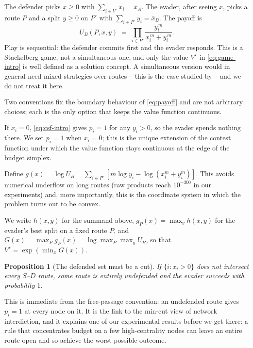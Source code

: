 \documentclass[11pt,a4paper]{article}
\theoremstyle{plain}
\newtheorem{proposition}[theorem]{Proposition}
\theoremstyle{definition}
\newcommand{\XA}{\bar{x}_A}
\newcommand{\XB}{\bar{x}_B}
\begin{document}
The defender picks $x\ge0$ with $\sum_{i\in V^{\circ}}x_i=\XA$. The evader,
after seeing $x$, picks a route $P$ and a split $y\ge0$ on $P^{\circ}$ with
$\sum_{i\in P^{\circ}}y_i=\XB$. The payoff is
\begin{equation}
  U_B(P,x,y)\;=\;\prod_{i\in P^{\circ}} \frac{y_i^{\,m}}{x_i^{\,m}+y_i^{\,m}}.
  \label{eq:payoff}
\end{equation}
Play is sequential: the defender commits first and the evader responds.
This is a Stackelberg game, not a simultaneous one, and only the value
$V^{\star}$ in \eqref{eq:game-intro} is well defined as a solution
concept. A simultaneous version would in general need mixed strategies
over routes -- this is the case studied by \citet{nguyen2023} -- and we do
not treat it here.

Two conventions fix the boundary behaviour of \eqref{eq:payoff} and are
not arbitrary choices; each is the only option that keeps the value
function continuous.

\begin{description}[leftmargin=1.2em]
\item[Zero defence means free passage.] If $x_i=0$, \eqref{eq:csf-intro}
  gives $p_i=1$ for any $y_i>0$, so the evader spends nothing there. We
  set $p_i=1$ when $x_i=0$; this is the unique extension of the contest
  function under which the value function stays continuous at the edge of
  the budget simplex.
\item[Work in logarithms.] Define
  $g(x)=\log U_B=\sum_{i\in P^{\circ}}[m\log y_i-\log(x_i^m+y_i^m)]$.
  This avoids numerical underflow on long routes (raw products reach
  $10^{-300}$ in our experiments) and, more importantly, this is the
  coordinate system in which the problem turns out to be convex.
\end{description}

We write $h(x,y)$ for the summand above, $g_P(x)=\max_y h(x,y)$ for the
evader's best split on a fixed route $P$, and
$G(x)=\max_P g_P(x)=\log\max_P\max_y U_B$, so that
$V^{\star}=\exp(\min_x G(x))$.

\begin{proposition}[The defended set must be a cut]
\label{prop:cut}
If $\{i:x_i>0\}$ does not intersect every $S$--$D$ route, some route is
entirely undefended and the evader succeeds with probability $1$.
\end{proposition}
This is immediate from the free-passage convention: an undefended route
gives $p_i=1$ at every node on it. It is the link to the min-cut view of
network interdiction, and it explains one of our experimental results
before we get there: a rule that concentrates budget on a few
high-centrality nodes can leave an entire route open and so achieve the
worst possible outcome.
\end{document}
